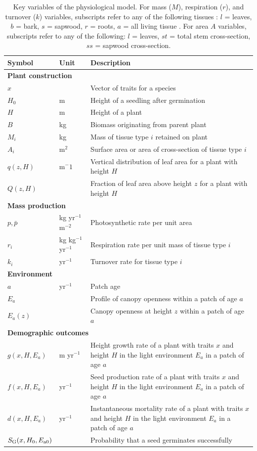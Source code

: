 \documentclass[10pt,twoside]{article}
\begin{document}
\begin{table}[h!]
\caption{Key variables of the physiological model. For mass ($M$), respiration ($r$), and turnover ($k$)
variables, subscripts refer to any of the following tissues : \(l\) = leaves, \(b\) = bark, \(s\) = sapwood,
\(r\) = roots, \(a\) = all living tissue  . For area \(A\) variables, subscripts refer to any of the following: \(l\) = leaves, \(st\) = total stem cross-section, \(ss\) = sapwood cross-section.}
\centering
\begin{tabular}{p{2cm}p{2.5cm}p{8cm}}
\hline
Symbol & Unit & Description \\
\hline
\multicolumn{3}{l}{\textbf{Plant construction}} \\
$x$ & & Vector of traits for a species\\
$H_0$ & m & Height of a seedling after germination\\
$H$ & m & Height of a plant\\
$B$ & kg & Biomass originating from parent plant\\
$M_i$ & kg & Mass of tissue type $i$ retained on plant \\
$A_i$ & m$^2$ & Surface area or area of cross-section of tissue type $i$\\
$q(z, H)$ & m$^-1$ & Vertical distribution of leaf area for a plant with height $H$\\
$Q(z, H)$ &  & Fraction of leaf area above height $z$ for a plant with height $H$\\
\multicolumn{3}{l}{\textbf{Mass production}} \\
$p,\bar{p}$ & kg yr$^{-1}$ m$^{-2}$ & Photosynthetic rate per unit area \\
$r_i$ & kg kg$^{-1}$ yr$^{-1}$ & Respiration rate per unit mass of tissue type $i$ \\
$k_i$ & yr$^{-1}$ & Turnover rate for tissue type $i$ \\
\multicolumn{3}{l}{\textbf{Environment}} \\
$a$ & yr$^{-1}$ & Patch age\\
$E_{a}$ & & Profile of canopy openness within a patch of age $a$\\
$E_{a}(z)$&& Canopy openness at height $z$ within a patch of age $a$\\
\multicolumn{3}{l}{\textbf{Demographic outcomes}} \\
$g(x, H, E_{a})$ & m yr$^{-1}$ & Height growth rate of a plant with traits $x$ and height $H$ in the light environment $E_a$ in a patch of age $a$ \\
$f(x, H, E_{a})$ & yr$^{-1}$ & Seed production rate of a plant with traits $x$ and height $H$ in the light environment $E_a$ in a patch of age $a$\\
$d(x, H, E_{a})$ & yr$^{-1}$ & Instantaneous mortality rate of a plant with traits $x$ and height $H$ in the light environment $E_a$ in a patch of age $a$\\
$S_{\rm G} (x, H_0, E_{{\rm a}0})$ & & Probability that a seed germinates successfully \\
\hline
\end{tabular}
\label{tab:definitions}
\end{table}
\end{document}
